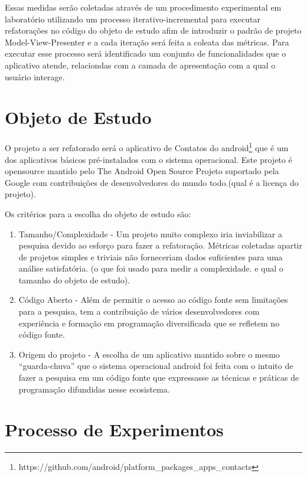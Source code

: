 Essas medidas serão coletadas através de um procedimento experimental em
laboratório utilizando um processo iterativo-incremental para executar
refatorações no código do objeto de estudo afim de introduzir o padrão de
projeto Model-View-Presenter e a cada iteração será feita a coleata das
métricas. Para executar esse processo será identificado um conjunto de
funcionalidades que o aplicativo atende, relaciondas com a camada de
apresentação com a qual o usuário interage.



\section{Objeto de Estudo}


O projeto a ser refatorado será o aplicativo de Contatos do
android\footnote{https://github.com/android/platform_packages_apps_contacts} que é um dos aplicativos básicos pré-instalados com o sistema
operacional. Este projeto é opensource mantido pelo  The Android Open Source
Projeto suportado pela Google com contribuições de desenvolvedores do mundo
todo.(qual é a licença do projeto).

Os critérios para a escolha do objeto de estudo são:

\begin{enumerate}
  \item Tamanho/Complexidade - Um projeto muito complexo iria inviabilizar a
  pesquisa devido ao esforço para fazer a refatoração. Métricas coletadas
  apartir de projetos simples e triviais não forneceriam dados suficientes para
  uma análise satisfatória. (o que foi usado para medir a complexidade. e qual
  o tamanho do objeto de estudo).
  \item Código Aberto - Além de permitir o acesso ao código fonte sem
  limitações para a pesquisa, tem a contribuição de vários desenvolvedores com
  experiência e formação em programação diversificada que se refletem no código fonte.
  \item Origem do projeto - A escolha de um aplicativo mantido sobre o mesmo
  ``guarda-chuva'' que o sistema operacional android foi feita com o intuito de
  fazer a pesquisa em um código fonte que expressasse as técnicas e práticas de
  programação difundidas nesse ecosistema.
\end{enumerate}

\section{Processo de Experimentos}


